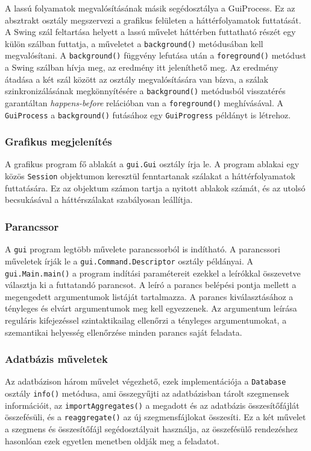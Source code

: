 A lassú folyamatok megvalósításának másik segédosztálya a GuiProcess.
Ez az absztrakt osztály megszervezi a grafikus felületen a háttérfolyamatok futtatását.
A Swing szál feltartása helyett a lassú művelet háttérben futtatható részét egy külön szálban futtatja, a műveletet a \texttt{background()} metódusában kell megvalósítani.
A \texttt{background()} függvény lefutása után a \texttt{foreground()} metódust a Swing szálban hívja meg, az eredmény itt jeleníthető meg.
Az eredmény átadása a két szál között az osztály megvalósítására van bízva, a szálak szinkronizálásának megkönnyítésére a \texttt{background()} metódusból visszatérés garantáltan \textit{happens-before} relációban van a \texttt{foreground()} meghívásával.
A \texttt{GuiProcess} a \texttt{background()} futásához egy \texttt{GuiProgress} példányt is létrehoz.

\subsubsection{Grafikus megjelenítés}

A grafikus program fő ablakát a \texttt{gui.Gui} osztály írja le.
A program ablakai egy közös \texttt{Session} objektumon keresztül fenntartanak szálakat a háttérfolyamatok futtatására.
Ez az objektum számon tartja a nyitott ablakok számát, és az utolsó becsukásával a háttérszálakat szabályosan leállítja.

\subsubsection{Parancssor}

A \texttt{gui} program legtöbb művelete parancssorból is indítható.
A parancssori műveletek írják le a \texttt{gui.Command.Descriptor} osztály példányai. A \texttt{gui.Main.main()} a program indítási paramétereit ezekkel a leírókkal összevetve választja ki a futtatandó parancsot.
A leíró a parancs belépési pontja mellett a megengedett argumentumok listáját tartalmazza.
A parancs kiválasztásához a tényleges és elvárt argumentumok meg kell egyezzenek.
Az argumentum leírása reguláris kifejezéssel szintaktikailag ellenőrzi a tényleges argumentumokat, a szemantikai helyesség ellenőrzése minden parancs saját feladata.

\subsubsection{Adatbázis műveletek}

Az adatbázison három művelet végezhető, ezek implementációja a \texttt{Database} osztály \texttt{info()} metódusa, ami összegyűjti az adatbázisban tárolt szegmensek információit, az \texttt{importAggregates()} a megadott és az adatbázis összesítőfájlát összefésüli, és a \texttt{reaggregate()} az új szegmensfájlokat összesíti.
Ez a két művelet a szegmens és összesítőfájl segédosztályait használja, az összefésülő rendezéshez hasonlóan ezek egyetlen menetben oldják meg a feladatot.

